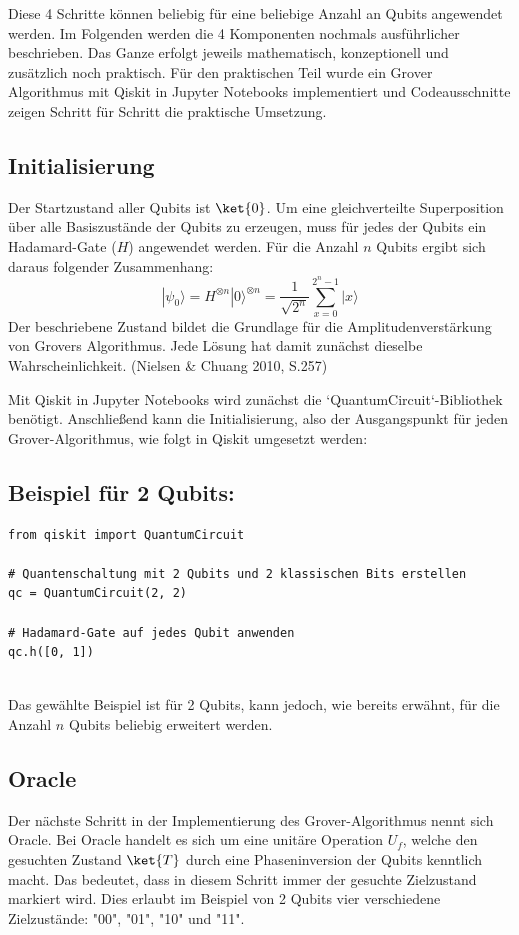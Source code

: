 Diese 4 Schritte können beliebig für eine beliebige Anzahl an Qubits angewendet werden. Im Folgenden werden die 4 Komponenten nochmals ausführlicher beschrieben. Das Ganze erfolgt jeweils mathematisch, konzeptionell und zusätzlich noch praktisch. Für den praktischen Teil wurde ein Grover Algorithmus mit Qiskit in Jupyter Notebooks implementiert und Codeausschnitte zeigen Schritt für Schritt die praktische Umsetzung.

\subsection*{Initialisierung}
Der Startzustand aller Qubits ist $\ket{0}$. Um eine gleichverteilte Superposition über alle Basiszustände der Qubits zu erzeugen, muss für jedes der Qubits ein Hadamard-Gate ($H$) angewendet werden. Für die Anzahl $n$ Qubits ergibt sich daraus folgender Zusammenhang:
$$
|\psi_0\rangle = H^{\otimes n}|0\rangle^{\otimes n} = \frac{1}{\sqrt{2^n}} \sum_{x=0}^{2^n-1} |x\rangle
$$
Der beschriebene Zustand bildet die Grundlage für die Amplitudenverstärkung von Grovers Algorithmus. Jede Lösung hat damit zunächst dieselbe Wahrscheinlichkeit. (Nielsen \& Chuang 2010, S.257)

Mit Qiskit in Jupyter Notebooks wird zunächst die `QuantumCircuit`-Bibliothek benötigt. Anschließend kann die Initialisierung, also der Ausgangspunkt für jeden Grover-Algorithmus, wie folgt in Qiskit umgesetzt werden:
\subsection*{Beispiel für 2 Qubits:}
\begin{verbatim}
from qiskit import QuantumCircuit

# Quantenschaltung mit 2 Qubits und 2 klassischen Bits erstellen
qc = QuantumCircuit(2, 2)

# Hadamard-Gate auf jedes Qubit anwenden
qc.h([0, 1])


\end{verbatim}


Das gewählte Beispiel ist für 2 Qubits, kann jedoch, wie bereits erwähnt, für die Anzahl $n$ Qubits beliebig erweitert werden.

\subsection*{Oracle}
Der nächste Schritt in der Implementierung des Grover-Algorithmus nennt sich Oracle. Bei Oracle handelt es sich um eine unitäre Operation $U_f$, welche den gesuchten Zustand $\ket{T}$ durch eine Phaseninversion der Qubits kenntlich macht. Das bedeutet, dass in diesem Schritt immer der gesuchte Zielzustand markiert wird. Dies erlaubt im Beispiel von 2 Qubits vier verschiedene Zielzustände: "00", "01", "10" und "11".

